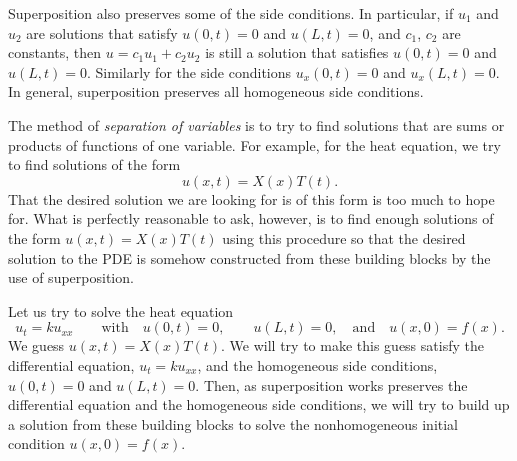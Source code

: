 Superposition also preserves some of the side conditions.  In particular,
if $u_1$ and $u_2$ are
solutions that satisfy $u(0,t) = 0$ and $u(L,t) = 0$,
and $c_1$, $c_2$ are constants, then
$u = c_1 u_1 + c_2 u_2$ is still a solution
that satisfies $u(0,t) = 0$ and $u(L,t) = 0$.  Similarly
for the side conditions $u_x(0,t) = 0$ and $u_x(L,t) = 0$.  In general,
superposition preserves all homogeneous side conditions.

The method of
\emph{separation of variables} is to
try to find solutions that are sums or products of functions of one variable.
For example, for the heat equation, we try to find solutions of the form
\begin{equation*}
u(x,t) = X(x)T(t) .
\end{equation*}
That the desired solution we are looking for is of this form is too much to
hope for.  What is perfectly reasonable to ask, however, is to find
enough  solutions of the form
$u(x,t) = X(x)T(t)$ using this procedure
so that the desired solution to the PDE is somehow constructed from these
building blocks by the use of superposition.

Let us try to solve the heat equation
\begin{equation*}
u_t = k u_{xx}
\qquad \text{with} \quad
u(0,t) = 0 ,\quad \quad u(L,t) = 0,
\quad \text{and} \quad u(x,0) = f(x) .
\end{equation*}
We guess $u(x,t) = X(x)T(t)$.  We will try to make this guess satisfy the
differential equation, $u_t = k u_{xx}$, and the homogeneous side conditions,
$u(0,t) = 0$ and $u(L,t) = 0$.  Then, as superposition works preserves the
differential equation and the homogeneous side conditions, we will try to
build up a solution from these building blocks to solve the
nonhomogeneous initial condition $u(x,0) = f(x)$.

